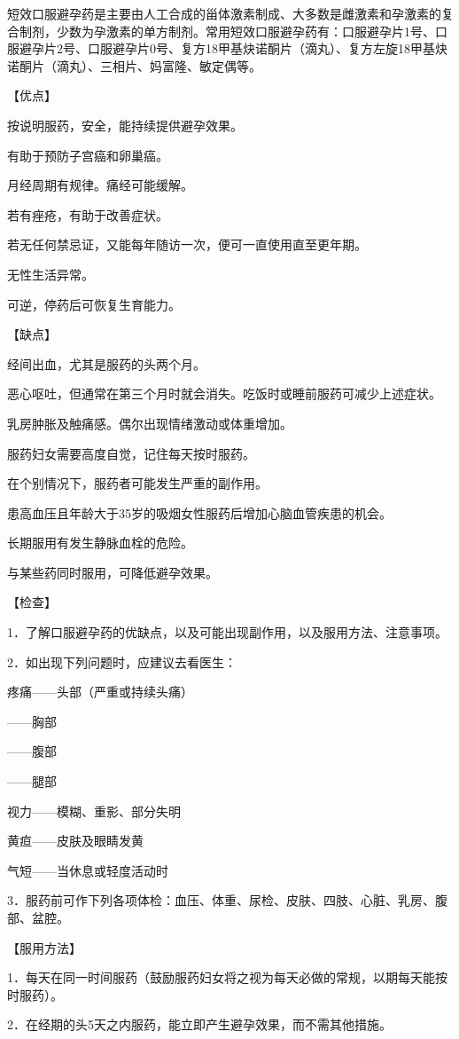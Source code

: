 \documentclass[12pt,UTF8,openany]{ctexbook}
\begin{document}
短效口服避孕药是主要由人工合成的甾体激素制成、大多数是雌激素和孕激素的复合制剂，少数为孕激素的单方制剂。常用短效口服避孕药有：口服避孕片1号、口服避孕片2号、口服避孕片0号、复方18甲基炔诺酮片（滴丸）、复方左旋18甲基炔诺酮片（滴丸）、三相片、妈富隆、敏定偶等。

【优点】

按说明服药，安全，能持续提供避孕效果。

有助于预防子宫癌和卵巢癌。

月经周期有规律。痛经可能缓解。

若有痤疮，有助于改善症状。

若无任何禁忌证，又能每年随访一次，便可一直使用直至更年期。

无性生活异常。

可逆，停药后可恢复生育能力。

【缺点】

经间出血，尤其是服药的头两个月。

恶心呕吐，但通常在第三个月时就会消失。吃饭时或睡前服药可减少上述症状。

乳房肿胀及触痛感。偶尔出现情绪激动或体重增加。

服药妇女需要高度自觉，记住每天按时服药。

在个别情况下，服药者可能发生严重的副作用。

患高血压且年龄大于35岁的吸烟女性服药后增加心脑血管疾患的机会。

长期服用有发生静脉血栓的危险。

与某些药同时服用，可降低避孕效果。

【检查】

1．了解口服避孕药的优缺点，以及可能出现副作用，以及服用方法、注意事项。

2．如出现下列问题时，应建议去看医生：

疼痛——头部（严重或持续头痛）

——胸部

——腹部

——腿部

视力——模糊、重影、部分失明

黄疸——皮肤及眼睛发黄

气短——当休息或轻度活动时

3．服药前可作下列各项体检：血压、体重、尿检、皮肤、四肢、心脏、乳房、腹部、盆腔。

【服用方法】

1．每天在同一时间服药（鼓励服药妇女将之视为每天必做的常规，以期每天能按时服药）。

2．在经期的头5天之内服药，能立即产生避孕效果，而不需其他措施。
\end{document}
